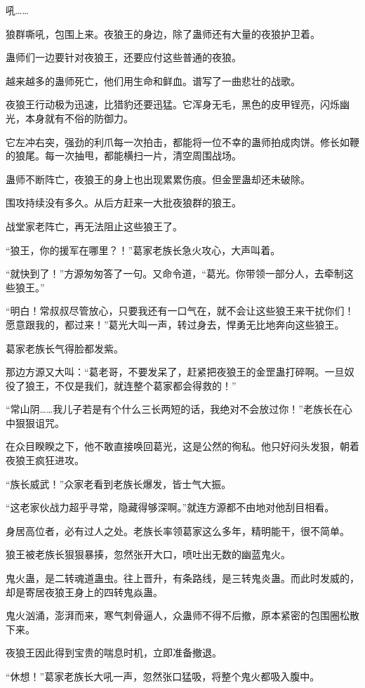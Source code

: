 \begin{this_body}
吼……

狼群嘶吼，包围上来。夜狼王的身边，除了蛊师还有大量的夜狼护卫着。

蛊师们一边要针对夜狼王，还要应付这些普通的夜狼。

越来越多的蛊师死亡，他们用生命和鲜血。谱写了一曲悲壮的战歌。

夜狼王行动极为迅速，比猎豹还要迅猛。它浑身无毛，黑色的皮甲锃亮，闪烁幽光，本身就有不俗的防御力。

它左冲右突，强劲的利爪每一次拍击，都能将一位不幸的蛊师拍成肉饼。修长如鞭的狼尾。每一次抽甩，都能横扫一片，清空周围战场。

蛊师不断阵亡，夜狼王的身上也出现累累伤痕。但金罡蛊却还未破除。

围攻持续没有多久。从后方赶来一大批夜狼群的狼王。

战堂家老阵亡，再无法阻止这些狼王了。

“狼王，你的援军在哪里？！”葛家老族长急火攻心，大声叫着。

“就快到了！”方源匆匆答了一句。又命令道，“葛光。你带领一部分人，去牵制这些狼王。”

“明白！常叔叔尽管放心，只要我还有一口气在，就不会让这些狼王来干扰你们！愿意跟我的，都过来！”葛光大叫一声，转过身去，悍勇无比地奔向这些狼王。

葛家老族长气得脸都发紫。

那边方源又大叫：“葛老哥，不要发呆了，赶紧把夜狼王的金罡蛊打碎啊。一旦奴役了狼王，不仅是我们，就连整个葛家都会得救的！”

“常山阴……我儿子若是有个什么三长两短的话，我绝对不会放过你！”老族长在心中狠狠诅咒。

在众目睽睽之下，他不敢直接唤回葛光，这是公然的徇私。他只好闷头发狠，朝着夜狼王疯狂进攻。

“族长威武！”众家老看到老族长爆发，皆士气大振。

“这老家伙战力超乎寻常，隐藏得够深啊。”就连方源都不由地对他刮目相看。

身居高位者，必有过人之处。老族长率领葛家这么多年，精明能干，很不简单。

狼王被老族长狠狠暴揍，忽然张开大口，喷吐出无数的幽蓝鬼火。

鬼火蛊，是二转魂道蛊虫。往上晋升，有条路线，是三转鬼炎蛊。而此时发威的，却是寄居夜狼王身上的四转鬼焱蛊。

鬼火汹涌，澎湃而来，寒气刺骨逼人，众蛊师不得不后撤，原本紧密的包围圈松散下来。

夜狼王因此得到宝贵的喘息时机，立即准备撤退。

“休想！”葛家老族长大吼一声，忽然张口猛吸，将整个鬼火都吸入腹中。


\end{this_body}
